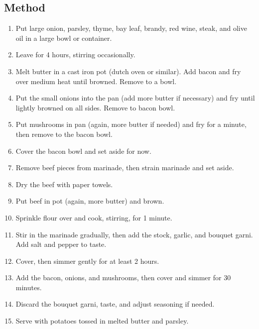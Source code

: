 \begin{multicols}{2}
      \vfill\null
    \columnbreak
    \subsection{Method}
      \begin{enumerate}
        \item Put large onion, parsley, thyme, bay leaf, brandy, red wine, steak, and olive oil in a large bowl or container.
        \item Leave for 4 hours, stirring occasionally.
        \item Melt butter in a cast iron pot (dutch oven or similar). Add bacon and fry over medium heat until browned. Remove to a bowl.
        \item Put the small onions into the pan (add more butter if necessary) and fry until lightly browned on all sides. Remove to bacon bowl.
        \item Put mushrooms in pan (again, more butter if needed) and fry for a minute, then remove to the bacon bowl.
        \item Cover the bacon bowl and set aside for now.
        \item Remove beef pieces from marinade, then strain marinade and set aside.
        \item Dry the beef with paper towels.
        \item Put beef in pot (again, more butter) and brown.
        \item Sprinkle flour over and cook, stirring, for 1 minute.
        \item Stir in the marinade gradually, then add the stock, garlic, and bouquet garni. Add salt and pepper to taste.
        \item Cover, then simmer gently for at least 2 hours.
        \item Add the bacon, onions, and mushrooms, then cover and simmer for 30 minutes.
        \item Discard the bouquet garni, taste, and adjust seasoning if needed.
        \item Serve with potatoes tossed in melted butter and parsley.
      \end{enumerate}
    \end{multicols}
